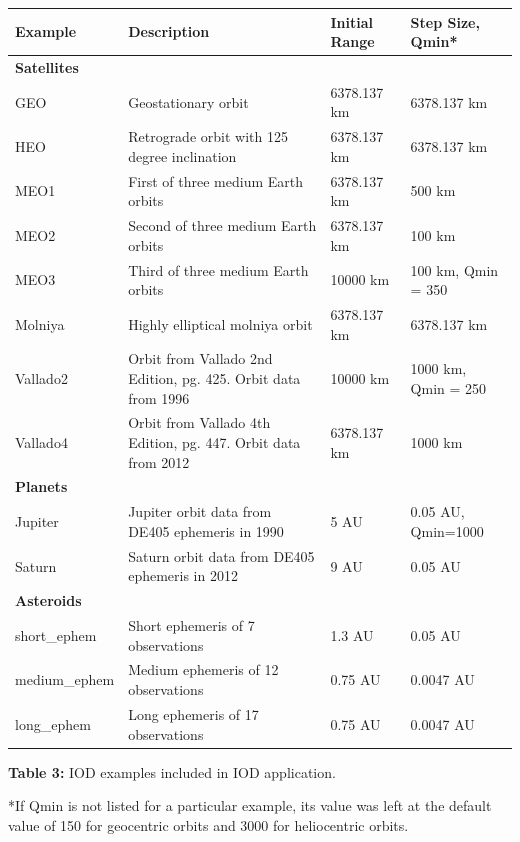 \documentclass{article}
\begin{document}
		\begin{center}
		\begin{tabular}{|p{3cm}| p{5cm}|p{2cm}|p{2cm}|}
			\hline
			\sc \textbf{Example} & \sc \textbf{Description} & \sc \textbf{Initial Range} & \sc \textbf{Step Size, Qmin*} \\ \hline
			\textbf{Satellites} & & &\\ \hline
			GEO & Geostationary orbit & 6378.137 km & 6378.137 km\\ \hline
			HEO & Retrograde orbit with 125 degree inclination & 6378.137 km & 6378.137 km\\ \hline
			MEO1 & First of three medium Earth orbits & 6378.137 km & 500 km\\ \hline
			MEO2 & Second of three medium Earth orbits & 6378.137 km & 100 km\\ \hline
			MEO3 & Third of three medium Earth orbits & 10000 km & 100 km, Qmin = 350\\ \hline
			Molniya & Highly elliptical molniya orbit & 6378.137 km & 6378.137 km\\ \hline
			Vallado2 & Orbit from Vallado 2nd Edition, pg. 425. Orbit data from 1996 & 10000 km & 1000 km, Qmin = 250\\ \hline
			Vallado4 & Orbit from Vallado 4th Edition, pg. 447. Orbit data from 2012 & 6378.137 km & 1000 km\\ \hline
			\textbf{Planets} & & &\\ \hline
			Jupiter & Jupiter orbit data from DE405 ephemeris in 1990 & 5 AU & 0.05 AU, Qmin=1000\\ \hline
			Saturn & Saturn orbit data from DE405 ephemeris in 2012 & 9 AU & 0.05 AU\\ \hline
			\textbf{Asteroids} & & &\\ \hline
			short\_ephem & Short ephemeris of 7 observations & 1.3 AU & 0.05 AU\\ \hline
			medium\_ephem & Medium ephemeris of 12 observations & 0.75 AU & 0.0047 AU\\ \hline
			long\_ephem & Long ephemeris of 17 observations & 0.75 AU & 0.0047 AU\\ \hline
		\end{tabular}
		\newline \newline
		\textbf{Table 3:} IOD examples included in IOD application.
		\end{center}
		*If Qmin is not listed for a particular example, its value was left at the default value of 150 for geocentric orbits and 3000 for heliocentric orbits. \newpage
		
\end{document}
